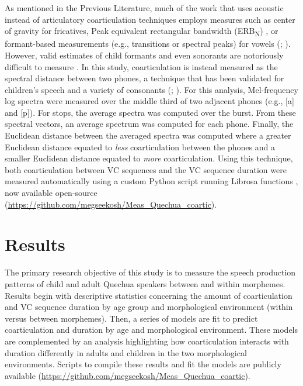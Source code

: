 \documentclass[a4paper,man,floatsintext,natbib,donotrepeattitle, apacite]{apa6}
\begin{document}
As mentioned in the Previous Literature, much of the work that uses acoustic instead of articulatory coarticulation techniques employs measures such as center of gravity for fricatives, Peak equivalent rectangular bandwidth (ERB\textsubscript{N}) \citep{reidyAcousticsWordInitialFricatives2017}, or formant-based measurements (e.g., transitions or spectral peaks) for vowels (\citealt{lehistePerceptionCoarticulationEffects1972}; \citealt{ohmanCoarticulationVCVUtterances1966}). However, valid estimates of child formants and even sonorants are notoriously difficult to measure \citep{chenF0inducedFormantMeasurement2019}. In this study, coarticulation is instead measured as the spectral distance between two phones, a technique that has been validated for children's speech and a variety of consonants (\citealt{cychoszSpectralTemporalMeasures2019}; \citealt{gerosaAnalyzingChildrenSpeech2006}). For this analysis, Mel-frequency log spectra were measured over the middle third of two adjacent phones (e.g., [a] and [p]). For stops, the average spectra was computed over the burst. From these spectral vectors, an average spectrum was computed for each phone. Finally, the Euclidean distance between the averaged spectra was computed where a greater Euclidean distance equated to \textit{less} coarticulation between the phones and a smaller Euclidean distance equated to \textit{more} coarticulation. Using this technique, both coarticulation between VC sequences and the VC sequence duration were measured automatically using a custom Python script running Librosa functions \citep{mcfeeLibrosaAudioMusic2015}, now available open-source (\url{https://github.com/megseekosh/Meas_Quechua_coartic}). 

\section{Results}

The primary research objective of this study is to measure the speech production patterns of child and adult Quechua speakers between and within morphemes. Results begin with descriptive statistics concerning the amount of coarticulation and VC sequence duration by age group and morphological environment (within versus between morphemes). Then, a series of models are fit to predict coarticulation and duration by age and morphological environment. These models are complemented by an analysis highlighting how coarticulation interacts with duration differently in adults and children in the two morphological environments. Scripts to compile these results and fit the models are publicly available (\url{https://github.com/megseekosh/Meas_Quechua_coartic}). 
\end{document}
